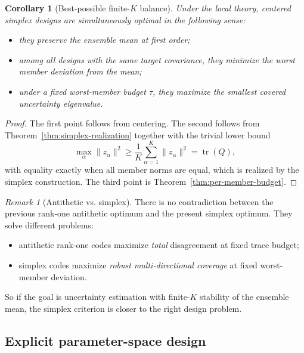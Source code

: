 \documentclass[11pt]{article}
\newcommand{\tr}{\operatorname{tr}}
\newtheorem{corollary}[theorem]{Corollary}
\theoremstyle{remark}
\newtheorem{remark}[theorem]{Remark}
\begin{document}
\begin{corollary}[Best-possible finite-$K$ balance]
\label{cor:best-balance}
Under the local theory, centered simplex designs are simultaneously optimal in the following sense:
\begin{itemize}
\item they preserve the ensemble mean at first order;
\item among all designs with the same target covariance, they minimize the worst member deviation from the mean;
\item under a fixed worst-member budget $\tau$, they maximize the smallest covered uncertainty eigenvalue.
\end{itemize}
\end{corollary}

\begin{proof}
The first point follows from centering. The second follows from Theorem~\ref{thm:simplex-realization} together with the trivial lower bound
\[
\max_\alpha \|z_\alpha\|^2 \ge \frac1K\sum_{\alpha=1}^K \|z_\alpha\|^2 = \tr(Q),
\]
with equality exactly when all member norms are equal, which is realized by the simplex construction. The third point is Theorem~\ref{thm:per-member-budget}.
\end{proof}

\begin{remark}[Antithetic vs. simplex]
There is no contradiction between the previous rank-one antithetic optimum and the present simplex optimum. They solve different problems:
\begin{itemize}
\item antithetic rank-one codes maximize \emph{total} disagreement at fixed trace budget;
\item simplex codes maximize \emph{robust multi-directional coverage} at fixed worst-member deviation.
\end{itemize}
So if the goal is uncertainty estimation with finite-$K$ stability of the ensemble mean, the simplex criterion is closer to the right design problem.
\end{remark}

\subsection*{Explicit parameter-space design}
\end{document}
